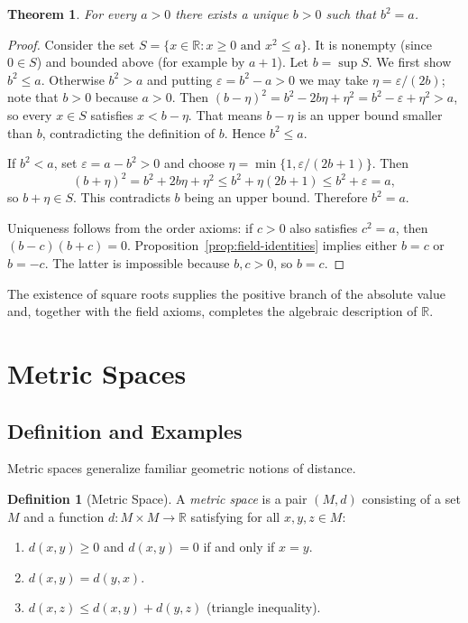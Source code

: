 \documentclass{article}
\theoremstyle{definition}
\newtheorem{definition}{Definition}[section]
\theoremstyle{plain}
\newtheorem{theorem}{Theorem}[section]
\begin{document}
	\begin{theorem}
	\label{thm:sqrt}
		For every $a>0$ there exists a unique $b>0$ such that $b^2=a$.
	\end{theorem}
	\begin{proof}
		Consider the set $S = \{x \in \mathbb{R} : x \geq 0 \text{ and } x^2 \leq a\}$. It is nonempty (since $0 \in S$) and bounded above (for example by $a+1$). Let $b = \sup S$. We first show $b^2 \leq a$. Otherwise $b^2 > a$ and putting $\varepsilon = b^2-a > 0$ we may take $\eta = \varepsilon/(2b)$; note that $b>0$ because $a>0$. Then $(b-\eta)^2 = b^2 - 2b\eta + \eta^2 = b^2 - \varepsilon + \eta^2 > a$, so every $x \in S$ satisfies $x < b-\eta$. That means $b-\eta$ is an upper bound smaller than $b$, contradicting the definition of $b$. Hence $b^2 \leq a$.

		If $b^2 < a$, set $\varepsilon = a - b^2 > 0$ and choose $\eta = \min\{1, \varepsilon/(2b+1)\}$. Then
		\[
			(b+\eta)^2 = b^2 + 2b\eta + \eta^2 \leq b^2 + \eta(2b+1) \leq b^2 + \varepsilon = a,
		\]
		so $b+\eta \in S$. This contradicts $b$ being an upper bound. Therefore $b^2 = a$.

		Uniqueness follows from the order axioms: if $c>0$ also satisfies $c^2=a$, then $(b-c)(b+c)=0$. Proposition~\ref{prop:field-identities} implies either $b=c$ or $b=-c$. The latter is impossible because $b,c>0$, so $b=c$.
	\end{proof}

	The existence of square roots supplies the positive branch of the absolute value and, together with the field axioms, completes the algebraic description of $\mathbb{R}$.


\section{Metric Spaces}\label{sec:metric-spaces}
	\subsection{Definition and Examples}\label{subsec:metric-examples}
Metric spaces generalize familiar geometric notions of distance.
\begin{definition}[Metric Space]\label{def:metric-space}
A \emph{metric space} is a pair $(M,d)$ consisting of a set $M$ and a function $d\colon M\times M\to \mathbb{R}$ satisfying for all $x,y,z\in M$:
\begin{enumerate}
	\item $d(x,y)\ge 0$ and $d(x,y)=0$ if and only if $x=y$.
	\item $d(x,y)=d(y,x)$.
	\item $d(x,z)\le d(x,y)+d(y,z)$ (triangle inequality).
\end{enumerate}
\end{definition}
\end{document}
